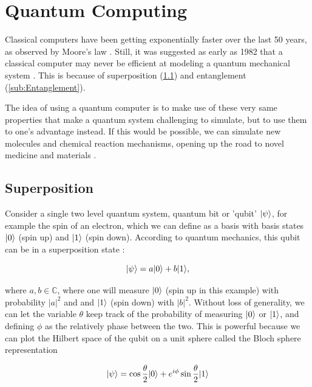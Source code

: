 \section{Quantum Computing}

Classical computers have been getting exponentially faster over the last 50 years, as observed by Moore's law \cite{Moore1965}. Still, it was suggested as early as 1982 that a classical computer may never be efficient at modeling a quantum mechanical system \cite{Feynman1982}. This is because of superposition (\cref{sub:Superposition}) and entanglement (\cref{sub:Entanglement}).

The idea of using a quantum computer is to make use of these very same properties that make a quantum system challenging to simulate, but to use them to one's advantage instead. If this would be possible, we can simulate new molecules and chemical reaction mechanisms, opening up the road to novel medicine \cite{Robert2021} and materials \cite{Ma2020}. 

\subsection{Superposition}\label{sub:Superposition}

Consider a single two level quantum system, quantum bit or 'qubit' $\lvert\psi\rangle$, for example the spin of an electron, which we can define as a basis with basis states $\lvert0\rangle$ (spin up) and $\lvert1\rangle$ (spin down). According to quantum mechanics, this qubit can be in a superposition state \cite{Griffiths2004}:

\begin{equation}\label{eq:SuperPositionBasic}
	\lvert\psi\rangle=a\lvert0\rangle+b\lvert1\rangle,
\end{equation}

where $a,b \in \mathbb{C}$, where one will measure $\lvert0\rangle$ (spin up in this example) with probability $|a|^2$ and and $\lvert1\rangle$ (spin down) with $|b|^2$. Without loss of generality, we can let the variable $\theta$ keep track of the probability of measuring $\lvert0\rangle$ or $\lvert1\rangle$, and defining $\phi$ as the relatively phase between the two. This is powerful because we can plot the Hilbert space of the qubit on a unit sphere called the Bloch sphere representation \cite{Nielsen2011}

\begin{equation}\label{eq:BlochSphere}
	\lvert\psi\rangle = 
	\cos{\frac{\theta}{2}} \lvert0\rangle + e^{i \phi} \sin{\frac{\theta}{2}} \lvert1\rangle
\end{equation}

